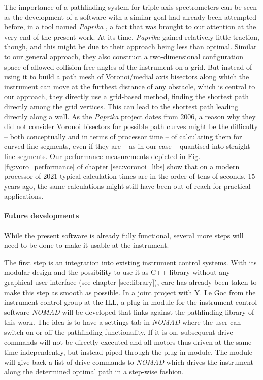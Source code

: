 The importance of a pathfinding system for triple-axis spectrometers can be seen as the development
of a software with a similar goal had already been attempted before, in a tool named 
\textit{Paprika} \cite{Muehlbauer2006}, a fact that was brought to our attention at the very end of the present work.
At its time, \textit{Paprika} gained relatively little traction, though, and this might be due to their approach 
being less than optimal.
Similar to our general approach, they also construct a two-dimensional configuration space of allowed collision-free 
angles of the instrument on a grid. But instead of using it to build a path mesh of Voronoi/medial axis 
bisectors along which the instrument can move at the furthest distance of any obstacle, which is central 
to our approach, they directly use a grid-based method, finding the shortest path directly among the grid vertices.
This can lead to the shortest path leading directly along a wall.
As the \textit{Paprika} project dates from 2006, a reason why they did not consider Voronoi bisectors 
for possible path curves might be the difficulty -- both conceptually and in terms of processor time -- 
of calculating them for curved line segments, even if they are -- as in our case -- quantised into straight 
line segments.
Our performance measurements depicted in Fig. \ref{fig:voro_performance} of chapter \ref{sec:voronoi_libs}
show that on a modern processor of 2021 typical calculation times are in the order of tens of seconds.
15 years ago, the same calculations might still have been out of reach for practical applications.


\paragraph{Future developments}
While the present software is already fully functional, several more steps will need to be done 
to make it usable at the instrument.

The first step is an integration into existing instrument control systems. 
With its modular design and the possibility to use it as C++ library without any graphical user interface
(see chapter \ref{sec:library}), care has already been taken to make this step as smooth as possible.
In a joint project with Y. Le Goc from the instrument control group at the ILL, a plug-in module for
the instrument control software \textit{NOMAD} \cite{web_NOMAD} will be developed that links against 
the pathfinding library of this work.
The idea is to have a settings tab in \textit{NOMAD} where the user can switch on or off the pathfinding
functionality. If it is on, subsequent drive commands will not be directly executed and all motors thus
driven at the same time independently, but instead piped through the plug-in module. 
The module will give back a list of drive commands to \textit{NOMAD} which drives the instrument
along the determined optimal path in a step-wise fashion.

